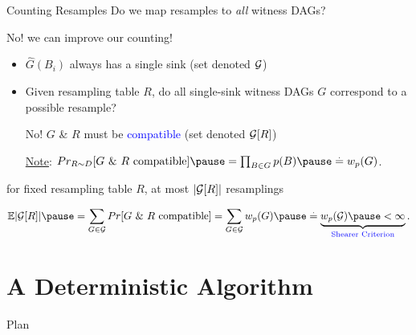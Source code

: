 \documentclass{beamer}
\def\spadding{\vspace{0.25cm}}
\def\b{\textcolor{blue}}
\newcommand*{\eqdef}{\overset{.}{=}}
\begin{document}

\begin{frame}{Counting Resamples}
Do we map resamples to \emph{all} witness DAGs?\pause\par
No! \follows we can improve our counting!\pause\spadding

\begin{itemize}
    \item $\hat{G}(B_i)$ always has a single sink (set denoted $\mathcal{G}$)\pause
    \item Given resampling table $R$, do all single-sink witness DAGs $G$ correspond to a possible resample?\pause
    
    \follows No! \pause$G$ \& $R$ must be \b{compatible} (set denoted $\mathcal{G}[R]$)\pause\spadding
    
    \underline{Note}: $\Pr[R \sim \distr]{\text{$G$ \& $R$ compatible}} \pause= \prod_{B \in G} \law(B) \pause\eqdef \w(G)$.
\end{itemize}\pause\spadding

\follows for fixed resampling table $R$, at most $|\mathcal{G}[R]|$ resamplings\pause

\vspace{-1.5em}\begin{align*}
    \E{|\compat{\G}{R}|} \pause= \sum_{G \in \G} \Pr{\text{$G$ \& $R$ compatible}} = \sum_{G\in\G} \w(G) \pause\eqdef \underbrace{\w(\G) \pause < \infty}_{\text{\b{Shearer Criterion}}}.
\end{align*}
\end{frame}

\section{A Deterministic Algorithm}
\begin{frame}{Plan}
\tableofcontents[currentsection, sectionstyle=show/shaded, hideothersubsections]
\end{frame}
\end{document}
